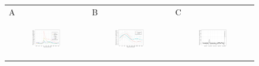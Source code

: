 \documentclass[11pt]{article}
\begin{document}
\begin{figure}[ht]
	\begin{tabular}{lll}
	A&B&C\\
	\begin{subfigure}[t]{0.30\linewidth}
		\centering
		\includegraphics[width=1\linewidth]{figs/figure-1a.pdf} 
	\end{subfigure}&
	\begin{subfigure}[t]{0.30\linewidth}
		\centering
		\includegraphics[width=1\linewidth]{figs/figure-1b.pdf}
	\end{subfigure}&
	\begin{subfigure}[t]{0.30\linewidth}
		\centering
		\includegraphics[width=1\linewidth]{figs/figure-1c.pdf}

\end{subfigure}
\end{tabular}
\end{figure}
\end{document}
